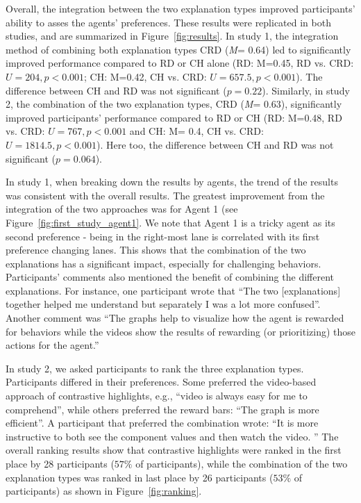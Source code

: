 \documentclass{ecai}
\begin{document}
Overall, the integration between the two explanation types improved participants' ability to asses the agents' preferences.
These results were replicated in both studies, and are summarized in Figure~\ref{fig:results}. 
In study 1, the integration method of combining both explanation types CRD (\textit{M}= 0.64) led to significantly improved performance compared to  RD or CH alone (RD: M=0.45, RD vs. CRD: $U=204,p<0.001$; CH: M=0.42, CH vs. CRD: $U=657.5, p<0.001$). The difference between CH and RD was not significant ($p = 0.22$).
Similarly, in study 2, the combination of the two explanation types, CRD (\textit{M}= 0.63), significantly improved participants' performance compared to RD  or CH (RD: M=0.48,  RD vs. CRD: $U= 767, p<0.001$ and CH: M= 0.4,  CH vs. CRD: $U= 1814.5, p<0.001$).  Here too, the difference between CH and RD was not significant ($p = 0.064$).




In study 1, when breaking down the results by agents, the trend of the results was consistent with the overall results. The greatest improvement from the integration of the two approaches was for Agent 1 (see Figure~\ref{fig:first_study_agent1}. We note that Agent 1 is a tricky agent  as its second preference - being in the right-most lane is correlated with its first preference changing lanes. This shows that the combination of the two explanations has a significant impact, especially for challenging behaviors. Participants' comments also mentioned the benefit of combining the different explanations. For instance, one participant wrote that ``The two [explanations] together helped me understand but separately I was a lot more confused''. Another comment was ``The graphs help to visualize how the agent is rewarded for behaviors while the videos show the results of rewarding (or prioritizing) those actions for the agent.''

In study 2, we asked participants to rank the three explanation types.
Participants differed in their preferences. Some preferred the video-based approach of contrastive highlights, e.g., ``video is always easy for me to comprehend'', while others preferred the reward bars: ``The graph is more efficient''. A participant that preferred the combination wrote: ``It is more instructive to both see the component values and then watch the video. ''
The overall ranking results show that contrastive highlights were ranked in the first place by 28  participants ($57\%$ of participants), while the combination of the two explanation types was ranked in last place by 26 participants  ($53\%$ of participants) as shown in Figure~\ref{fig:ranking}.
\end{document}
